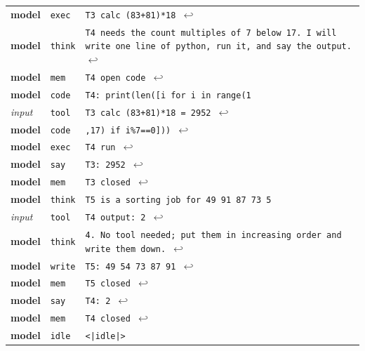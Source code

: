 \begin{tabular}{llp{11.5cm}}
\textbf{model} & \texttt{exec} & \texttt{T3 calc (83+81)*18 $\hookleftarrow$} \\
\textbf{model} & \texttt{think} & \texttt{T4 needs the count multiples of 7 below 17. I will write one line of python, run it, and say the output. $\hookleftarrow$} \\
\textbf{model} & \texttt{mem} & \texttt{T4 open code $\hookleftarrow$} \\
\textbf{model} & \texttt{code} & \texttt{T4: print(len([i for i in range(1} \\
\textit{input} & \texttt{tool} & \texttt{T3 calc (83+81)*18 = 2952 $\hookleftarrow$} \\
\textbf{model} & \texttt{code} & \texttt{,17) if i\%7==0])) $\hookleftarrow$} \\
\textbf{model} & \texttt{exec} & \texttt{T4 run $\hookleftarrow$} \\
\textbf{model} & \texttt{say} & \texttt{T3: 2952 $\hookleftarrow$} \\
\textbf{model} & \texttt{mem} & \texttt{T3 closed $\hookleftarrow$} \\
\textbf{model} & \texttt{think} & \texttt{T5 is a sorting job for 49 91 87 73 5} \\
\textit{input} & \texttt{tool} & \texttt{T4 output: 2 $\hookleftarrow$} \\
\textbf{model} & \texttt{think} & \texttt{4. No tool needed; put them in increasing order and write them down. $\hookleftarrow$} \\
\textbf{model} & \texttt{write} & \texttt{T5: 49 54 73 87 91 $\hookleftarrow$} \\
\textbf{model} & \texttt{mem} & \texttt{T5 closed $\hookleftarrow$} \\
\textbf{model} & \texttt{say} & \texttt{T4: 2 $\hookleftarrow$} \\
\textbf{model} & \texttt{mem} & \texttt{T4 closed $\hookleftarrow$} \\
\textbf{model} & \texttt{idle} & \texttt{\textless{}|idle|\textgreater{}} \\
\bottomrule
\end{tabular}
